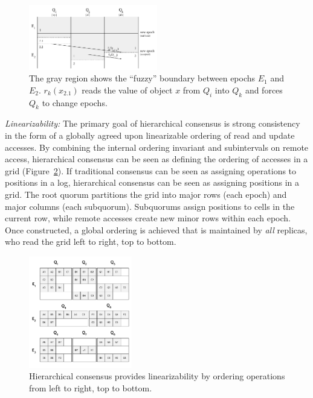 \documentclass[sigconf]{acmart}
\begin{document}
\begin{figure}[t]
    \centering
    \includegraphics[width=0.5\textwidth]{figures/fuzzy}
    \caption{The gray region shows the ``fuzzy'' boundary between epochs $E_1$
      and $E_2$. $r_k(x_{2.1})$ reads the value of object $x$ from $Q_i$ into
      $Q_k$ and forces $Q_k$ to change epochs.}
    \label{fig:fuzzy}
\vspace{-.2in}
\end{figure}

\vspace{.03in}
\noindent
\textsl{Linearizability:}
The primary goal of hierarchical consensus is strong consistency in the form of a
globally agreed upon linearizable ordering of read and update accesses.
By combining the internal ordering invariant and subintervals on remote access,
hierarchical consensus can be seen as defining the ordering of accesses in a grid
(Figure~\ref{fig:linearizability}).
If traditional consensus can be seen as assigning operations to positions in a log,
hierarchical consensus can be seen as assigning positions in a grid.
The root quorum partitions the grid into major rows (each epoch) and major columns
(each subquorum).
Subquorums assign positions to cells in the current row, while remote accesses create
new minor rows within each epoch.
Once constructed, a global ordering is achieved that is maintained by \emph{all} replicas,
who read the grid left to right, top to bottom.


\begin{figure}[t]
    \centering
    \includegraphics[width=0.4\textwidth]{figures/linearizability}
    \caption{Hierarchical consensus provides linearizability by ordering operations from left to right, top to bottom.}
    \label{fig:linearizability}
\vspace{-.2in}
\end{figure}
\end{document}
